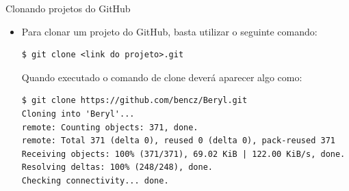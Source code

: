 \begin{slide}[method=direct]{Clonando projetos do GitHub}
	\begin{itemize}
	\item{Para clonar um projeto do GitHub, basta utilizar o seguinte comando:
	\begin{lstlisting}[style=Bash]
$ git clone <link do projeto>.git
	\end{lstlisting}
	Quando executado o comando de clone deverá aparecer algo como:
	\begin{lstlisting}[style=Bash,basicstyle=\tiny]
$ git clone https://github.com/bencz/Beryl.git
Cloning into 'Beryl'...
remote: Counting objects: 371, done.
remote: Total 371 (delta 0), reused 0 (delta 0), pack-reused 371
Receiving objects: 100% (371/371), 69.02 KiB | 122.00 KiB/s, done.
Resolving deltas: 100% (248/248), done.
Checking connectivity... done.
	\end{lstlisting}
	}
	\end{itemize}
\end{slide}